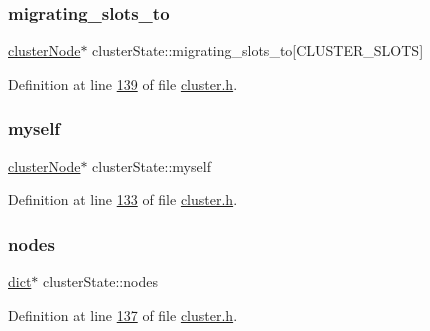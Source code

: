 \mbox{\label{structclusterState_ac79d09770ee5089effad9ba6b60d8ea7}} 
\subsubsection{\texorpdfstring{migrating\+\_\+slots\+\_\+to}{migrating\_slots\_to}}
{\footnotesize\ttfamily \hyperlink{structclusterNode}{cluster\+Node}$\ast$ cluster\+State\+::migrating\+\_\+slots\+\_\+to\mbox{[}C\+L\+U\+S\+T\+E\+R\+\_\+\+S\+L\+O\+TS\mbox{]}}



Definition at line \hyperlink{cluster_8h_source_l00139}{139} of file \hyperlink{cluster_8h_source}{cluster.\+h}.

\mbox{\label{structclusterState_a40512f248f0162974ee06af5a1ab3d0c}} 
\subsubsection{\texorpdfstring{myself}{myself}}
{\footnotesize\ttfamily \hyperlink{structclusterNode}{cluster\+Node}$\ast$ cluster\+State\+::myself}



Definition at line \hyperlink{cluster_8h_source_l00133}{133} of file \hyperlink{cluster_8h_source}{cluster.\+h}.

\mbox{\label{structclusterState_aa931d12287ceee735a18a2bbf22575fb}} 
\subsubsection{\texorpdfstring{nodes}{nodes}}
{\footnotesize\ttfamily \hyperlink{structdict}{dict}$\ast$ cluster\+State\+::nodes}



Definition at line \hyperlink{cluster_8h_source_l00137}{137} of file \hyperlink{cluster_8h_source}{cluster.\+h}.

\mbox{\label{structclusterState_af1282691ef30aad603edaf8573864364}} 
